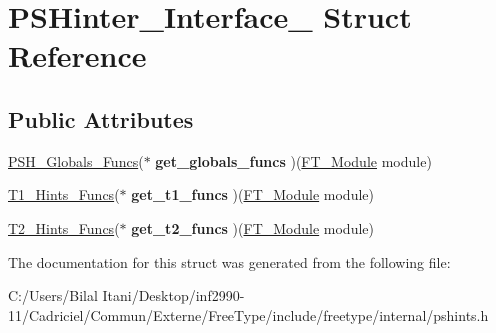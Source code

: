 \hypertarget{struct_p_s_hinter___interface__}{}\section{P\+S\+Hinter\+\_\+\+Interface\+\_\+ Struct Reference}
\label{struct_p_s_hinter___interface__}
\subsection*{Public Attributes}
\begin{DoxyCompactItemize}
\item 
\hyperlink{struct_p_s_h___globals___funcs_rec__}{P\+S\+H\+\_\+\+Globals\+\_\+\+Funcs}($\ast$ {\bfseries get\+\_\+globals\+\_\+funcs} )(\hyperlink{struct_f_t___module_rec__}{F\+T\+\_\+\+Module} module)\hypertarget{struct_p_s_hinter___interface___a76e43921277f51cb28ac5f5ca5d4d849}{}\label{struct_p_s_hinter___interface___a76e43921277f51cb28ac5f5ca5d4d849}

\item 
\hyperlink{struct_t1___hints___funcs_rec__}{T1\+\_\+\+Hints\+\_\+\+Funcs}($\ast$ {\bfseries get\+\_\+t1\+\_\+funcs} )(\hyperlink{struct_f_t___module_rec__}{F\+T\+\_\+\+Module} module)\hypertarget{struct_p_s_hinter___interface___ae46a2b9590a09e77c7fa435e5e6d7cb4}{}\label{struct_p_s_hinter___interface___ae46a2b9590a09e77c7fa435e5e6d7cb4}

\item 
\hyperlink{struct_t2___hints___funcs_rec__}{T2\+\_\+\+Hints\+\_\+\+Funcs}($\ast$ {\bfseries get\+\_\+t2\+\_\+funcs} )(\hyperlink{struct_f_t___module_rec__}{F\+T\+\_\+\+Module} module)\hypertarget{struct_p_s_hinter___interface___aff676c6c5e3ca1d266cdd2d4321b21f2}{}\label{struct_p_s_hinter___interface___aff676c6c5e3ca1d266cdd2d4321b21f2}

\end{DoxyCompactItemize}


The documentation for this struct was generated from the following file\+:\begin{DoxyCompactItemize}
\item 
C\+:/\+Users/\+Bilal Itani/\+Desktop/inf2990-\/11/\+Cadriciel/\+Commun/\+Externe/\+Free\+Type/include/freetype/internal/pshints.\+h\end{DoxyCompactItemize}
